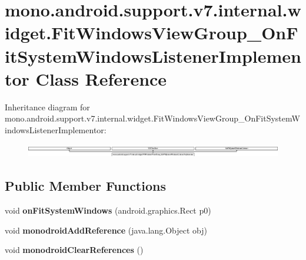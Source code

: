 \hypertarget{classmono_1_1android_1_1support_1_1v7_1_1internal_1_1widget_1_1FitWindowsViewGroup__OnFitSystemWindowsListenerImplementor}{}\section{mono.\+android.\+support.\+v7.\+internal.\+widget.\+Fit\+Windows\+View\+Group\+\_\+\+On\+Fit\+System\+Windows\+Listener\+Implementor Class Reference}
\label{classmono_1_1android_1_1support_1_1v7_1_1internal_1_1widget_1_1FitWindowsViewGroup__OnFitSystemWindowsListenerImplementor}
Inheritance diagram for mono.\+android.\+support.\+v7.\+internal.\+widget.\+Fit\+Windows\+View\+Group\+\_\+\+On\+Fit\+System\+Windows\+Listener\+Implementor\+:\begin{figure}[H]
\begin{center}
\leavevmode
\includegraphics[height=0.604099cm]{classmono_1_1android_1_1support_1_1v7_1_1internal_1_1widget_1_1FitWindowsViewGroup__OnFitSystemWindowsListenerImplementor}
\end{center}
\end{figure}
\subsection*{Public Member Functions}
\begin{DoxyCompactItemize}
\item 
\hypertarget{classmono_1_1android_1_1support_1_1v7_1_1internal_1_1widget_1_1FitWindowsViewGroup__OnFitSystemWindowsListenerImplementor_a592dd3da7fc7542930816f1ef2beea64}{}void {\bfseries on\+Fit\+System\+Windows} (android.\+graphics.\+Rect p0)\label{classmono_1_1android_1_1support_1_1v7_1_1internal_1_1widget_1_1FitWindowsViewGroup__OnFitSystemWindowsListenerImplementor_a592dd3da7fc7542930816f1ef2beea64}

\item 
\hypertarget{classmono_1_1android_1_1support_1_1v7_1_1internal_1_1widget_1_1FitWindowsViewGroup__OnFitSystemWindowsListenerImplementor_adc7c5606f213202becf8040767c2fe55}{}void {\bfseries monodroid\+Add\+Reference} (java.\+lang.\+Object obj)\label{classmono_1_1android_1_1support_1_1v7_1_1internal_1_1widget_1_1FitWindowsViewGroup__OnFitSystemWindowsListenerImplementor_adc7c5606f213202becf8040767c2fe55}

\item 
\hypertarget{classmono_1_1android_1_1support_1_1v7_1_1internal_1_1widget_1_1FitWindowsViewGroup__OnFitSystemWindowsListenerImplementor_a826fd08af81362d4e1e85529d5d7575b}{}void {\bfseries monodroid\+Clear\+References} ()\label{classmono_1_1android_1_1support_1_1v7_1_1internal_1_1widget_1_1FitWindowsViewGroup__OnFitSystemWindowsListenerImplementor_a826fd08af81362d4e1e85529d5d7575b}

\end{DoxyCompactItemize}


